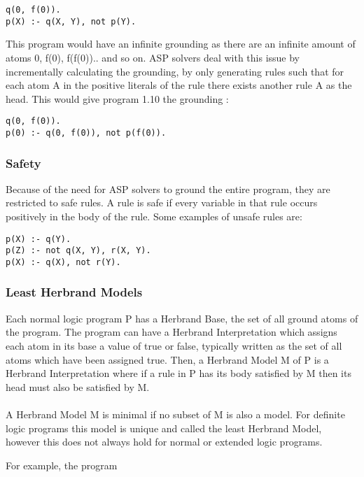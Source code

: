 \begin{lstlisting}
q(0, f(0)).
p(X) :- q(X, Y), not p(Y).
\end{lstlisting}

This program would have an infinite grounding as there are an infinite amount of atoms 0, f(0), f(f(0)).. and so on. ASP solvers deal with this issue by incrementally calculating the grounding, by only generating rules such that for each atom A in the positive literals of the rule there exists another rule A as the head. This would give program 1.10 the grounding :

\begin{lstlisting}
q(0, f(0)).
p(0) :- q(0, f(0)), not p(f(0)).
\end{lstlisting}

\subsubsection{Safety}

Because of the need for ASP solvers to ground the entire program, they are restricted to safe rules. A rule is safe if every variable in that rule occurs positively in the body of the rule. Some examples of unsafe rules are:

\begin{lstlisting}
p(X) :- q(Y).
p(Z) :- not q(X, Y), r(X, Y).
p(X) :- q(X), not r(Y).
\end{lstlisting}

\subsubsection{Least Herbrand Models}

Each normal logic program P has a Herbrand Base, the set of all ground atoms of the program. The program can have a Herbrand Interpretation which assigns each atom in its base a value of true or false, typically written as the set of all atoms which have  been assigned true. Then, a Herbrand Model M of P is a Herbrand Interpretation where if a rule in P has its body satisfied by M then its head must also be satisfied by M. \\ \\
A Herbrand Model M is minimal if no subset of M is also a model. For definite logic programs this model is unique and called the least Herbrand Model, however this does not always hold for normal or extended logic programs.

For example, the program 


